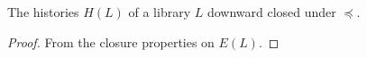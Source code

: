\begin{lemma}
  
  The histories $H(L)$ of a library $L$ downward closed under $\preceq$.

\end{lemma}

\begin{proof}

  From the closure properties on $E(L)$.

\end{proof}



